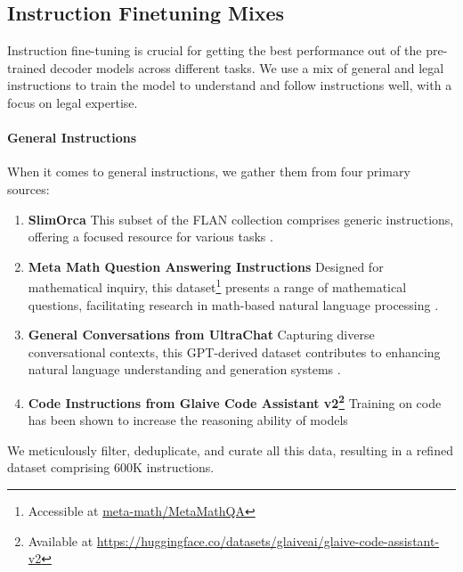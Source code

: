 \subsection{Instruction Finetuning Mixes}
Instruction fine-tuning is crucial for getting the best performance out of the pre-trained decoder models across different tasks. We use a mix of general and legal instructions to train the model to understand and follow instructions well, with a focus on legal expertise. 

\paragraph{General Instructions}
When it comes to general instructions, we gather them from four primary sources:
\begin{enumerate}
    \item \textbf{SlimOrca} This subset of the FLAN collection comprises generic instructions, offering a focused resource for various tasks \cite{mukherjee2023orca,SlimOrca}.
    \item \textbf{Meta Math Question Answering Instructions} Designed for mathematical inquiry, this dataset\footnote{Accessible at \url{meta-math/MetaMathQA}} presents a range of mathematical questions, facilitating research in math-based natural language processing \cite{yu2023metamath}.
    \item \textbf{General Conversations from UltraChat} Capturing diverse conversational contexts, this GPT-derived dataset contributes to enhancing natural language understanding and generation systems \cite{ding2023enhancing}.
    \item \textbf{Code Instructions from Glaive Code Assistant v2\footnote{Available at \url{https://huggingface.co/datasets/glaiveai/glaive-code-assistant-v2}}} Training on code has been shown to increase the reasoning ability of models \citep{ma2023training}
\end{enumerate}

We meticulously filter, deduplicate, and curate all this data, resulting in a refined dataset comprising $600$K instructions.
 
